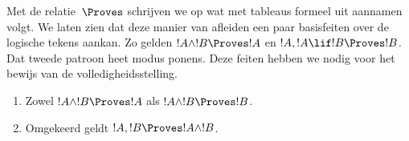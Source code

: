 \documentclass[../../../include/open-logic-section]{subfiles}
\begin{document}
      {}
      {}


\begin{explain}
  Met de relatie~$\Proves$ schrijven we op wat met tableaus formeel
  uit aannamen volgt. We laten zien dat deze manier van afleiden een
  paar basisfeiten over de logische tekens aankan. Zo gelden
  $!A \land !B \Proves !A$ en $!A, !A \lif !B \Proves !B$. Dat tweede
  patroon heet modus ponens. Deze feiten hebben we nodig voor het
  bewijs van de volledigheidsstelling.
\end{explain}

\begin{prop}
  \begin{enumerate}
  \item {} Zowel $!A \land !B \Proves
    !A$ als $!A \land !B \Proves !B$.
  \item {} Omgekeerd geldt
    $!A, !B \Proves !A \land !B$.
  \end{enumerate}
\end{prop}
\end{document}
